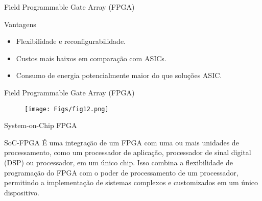\documentclass[aspectratio=169]{beamer}
\begin{document}
\begin{frame}{Field Programmable Gate Array (FPGA)}
	\justifying
	
	\begin{block}{Vantagens}
		\justifying
		\begin{itemize}
			\item Flexibilidade e reconfigurabilidade.
			\item Custos mais baixos em comparação com ASICs.
			\item Consumo de energia potencialmente maior do que soluções ASIC.
		\end{itemize}
		
	\end{block}			
	

\end{frame}







\begin{frame}{Field Programmable Gate Array (FPGA)}
	\justifying
	
	\begin{figure}[h]
		\centering
		\texttt{[image: Figs/fig12.png]}
	\end{figure}	

\end{frame}

\begin{frame}{System-on-Chip FPGA}
	\justifying
	
	\begin{block}{SoC-FPGA}
		\justifying
		É uma integração de um FPGA com uma ou mais unidades de processamento, como um processador de aplicação, processador de sinal digital (DSP) ou processador, em um único chip. Isso combina a flexibilidade de programação do FPGA com o poder de processamento de um processador, permitindo a implementação de sistemas complexos e customizados em um único dispositivo.
		
	\end{block}	
	
\end{frame}
\end{document}
